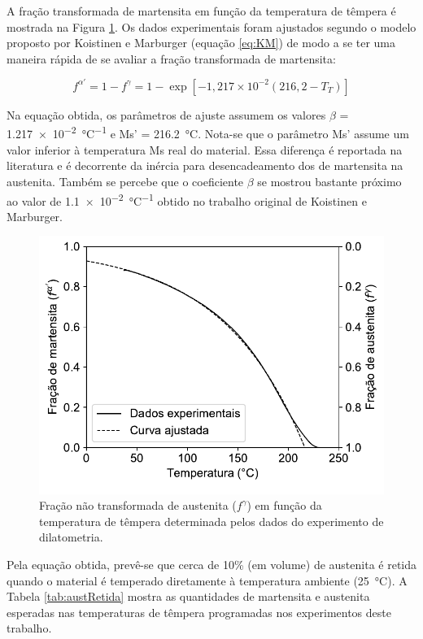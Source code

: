 A fração transformada de martensita em função da temperatura de têmpera é mostrada na Figura \ref{fig:KMFoFo}. Os dados experimentais foram ajustados segundo o modelo proposto por Koistinen e Marburger (equação \ref{eq:KM}) de modo a se ter uma maneira rápida de se avaliar a fração transformada de martensita:

\begin{equation}
  f^{\alpha'} = 1 - f^\gamma = 1 - \exp\left[ -1,217 \times 10^{-2} \left( 216,2 - T_T \right) \right]
\end{equation}

Na equação obtida, os parâmetros de ajuste assumem os valores \linebreak$\beta$ = \SI{1.217e-2}{\degreeCelsius^{-1}} e Ms' = \SI{216.2}{\degreeCelsius}. Nota-se que o parâmetro Ms' assume um valor inferior à temperatura Ms real do material. Essa diferença é reportada na literatura e é decorrente da inércia para desencadeamento dos  de martensita na austenita\cite{VanBohemen2008}. Também se percebe que o coeficiente $\beta$ se mostrou bastante próximo ao valor de \SI{1.1e-2}{\degreeCelsius^{-1}} obtido no trabalho original de Koistinen e Marburger\cite{Koistinen1959}.

\begin{figure}
  \includegraphics[width=.7\textwidth]{img/dilatometria/frac_martensita.pdf}
  \caption{Fração não transformada de austenita ($f^\gamma$) em função da temperatura de têmpera determinada pelos dados do experimento de dilatometria.}
  \label{fig:KMFoFo}
\end{figure}

Pela equação obtida, prevê-se que cerca de 10\% (em volume) de austenita é retida quando o material é temperado diretamente à temperatura ambiente (\SI{25}{\degreeCelsius}). A Tabela \ref{tab:austRetida} mostra as quantidades de martensita e austenita esperadas nas temperaturas de têmpera programadas nos experimentos deste trabalho.

